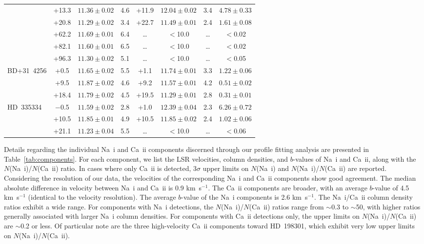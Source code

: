 \documentclass[fleqn,usenatbib]{mnras}
\begin{document}
\begin{table}
\begin{tabular}{lccccccc}
 & +13.3 & $11.36\pm0.02$ & 4.6 & +11.9 & $12.04\pm0.02$ & 3.4 & $4.78\pm0.33$ \\
 & +20.8 & $11.29\pm0.02$ & 3.4 & +22.7 & $11.49\pm0.01$ & 2.4 & $1.61\pm0.08$ \\
 & +62.2 & $11.69\pm0.01$ & 6.4 & \ldots & $<$10.0 & \ldots & $<$0.02 \\
 & +82.1 & $11.60\pm0.01$ & 6.5 & \ldots & $<$10.0 & \ldots & $<$0.02 \\
 & +96.3 & $11.30\pm0.02$ & 5.1 & \ldots & $<$10.0 & \ldots & $<$0.05 \\
BD+31~4256 & +0.5 & $11.65\pm0.02$ & 5.5 & +1.1 & $11.74\pm0.01$ & 3.3 & $1.22\pm0.06$ \\
 & +9.5 & $11.87\pm0.02$ & 4.6 & +9.2 & $11.57\pm0.01$ & 4.2 & $0.51\pm0.02$ \\
 & +18.4 & $11.79\pm0.02$ & 4.5 & +19.5 & $11.29\pm0.01$ & 2.8 & $0.31\pm0.01$ \\
HD~335334 & $-$0.5 & $11.59\pm0.02$ & 2.8 & +1.0 & $12.39\pm0.04$ & 2.3 & $6.26\pm0.72$ \\
 & +10.5 & $11.85\pm0.01$ & 4.9 & +10.5 & $11.85\pm0.02$ & 2.4 & $1.02\pm0.06$ \\
 & +21.1 & $11.23\pm0.04$ & 5.5 & \ldots & $<$10.0 & \ldots & $<$0.06 \\
\hline
\end{tabular}
\end{table}

Details regarding the individual Na~{\sc i} and Ca~{\sc ii} components discerned through our profile fitting analysis are presented in Table~\ref{tab:components}. For each component, we list the LSR velocities, column densities, and $b$-values of Na~{\sc i} and Ca~{\sc ii}, along with the $N$(Na~{\sc i})/$N$(Ca~{\sc ii}) ratio. In cases where only Ca~{\sc ii} is detected, 3$\sigma$ upper limits on $N$(Na~{\sc i}) and $N$(Na~{\sc i})/$N$(Ca~{\sc ii}) are reported. Considering the resolution of our data, the velocities of the corresponding Na~{\sc i} and Ca~{\sc ii} components show good agreement. The median absolute difference in velocity between Na~{\sc i} and Ca~{\sc ii} is 0.9 km~s$^{-1}$. The Ca~{\sc ii} components are broader, with an average $b$-value of 4.5 km~s$^{-1}$ (identical to the velocity resolution). The average $b$-value of the Na~{\sc i} components is 2.6 km~s$^{-1}$. The Na~{\sc i}/Ca~{\sc ii} column density ratios exhibit a wide range. For components with Na~{\sc i} detections, the $N$(Na~{\sc i})/$N$(Ca~{\sc ii}) ratios range from $\sim$0.3 to $\sim$50, with higher ratios generally associated with larger Na~{\sc i} column densities. For components with Ca~{\sc ii} detections only, the upper limits on $N$(Na~{\sc i})/$N$(Ca~{\sc ii}) are $\sim$0.2 or less. Of particular note are the three high-velocity Ca~{\sc ii} components toward HD~198301, which exhibit very low upper limits on $N$(Na~{\sc i})/$N$(Ca~{\sc ii}).
\end{document}
